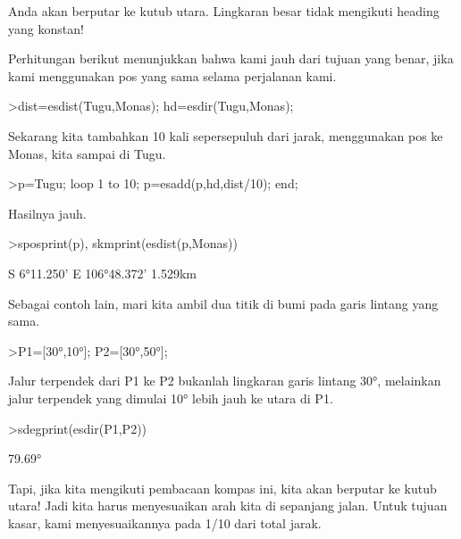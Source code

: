 \documentclass[a4paper,10pt]{article}
\begin{document}
\begin{eulernotebook}
\begin{eulercomment}
\begin{eulercomment}
\begin{eulercomment}
\begin{eulercomment}
\begin{eulercomment}
\begin{eulercomment}
\begin{eulercomment}
\begin{eulercomment}
\begin{eulercomment}
\begin{eulercomment}
\begin{eulercomment}
\begin{eulercomment}
\begin{eulercomment}
\begin{eulercomment}
\begin{eulercomment}
\begin{eulercomment}
\begin{eulercomment}
Anda akan berputar ke kutub utara. Lingkaran besar tidak mengikuti
heading yang konstan!

Perhitungan berikut menunjukkan bahwa kami jauh dari tujuan yang
benar, jika kami menggunakan pos yang sama selama perjalanan kami.
\end{eulercomment}
\begin{eulerprompt}
>dist=esdist(Tugu,Monas); hd=esdir(Tugu,Monas);
\end{eulerprompt}
\begin{eulercomment}
Sekarang kita tambahkan 10 kali sepersepuluh dari jarak, menggunakan
pos ke Monas, kita sampai di Tugu.
\end{eulercomment}
\begin{eulerprompt}
>p=Tugu; loop 1 to 10; p=esadd(p,hd,dist/10); end;
\end{eulerprompt}
\begin{eulercomment}
Hasilnya jauh.
\end{eulercomment}
\begin{eulerprompt}
>sposprint(p), skmprint(esdist(p,Monas))
\end{eulerprompt}
\begin{euleroutput}
  S 6°11.250' E 106°48.372'
       1.529km
\end{euleroutput}
\begin{eulercomment}
Sebagai contoh lain, mari kita ambil dua titik di bumi pada garis
lintang yang sama.
\end{eulercomment}
\begin{eulerprompt}
>P1=[30°,10°]; P2=[30°,50°];
\end{eulerprompt}
\begin{eulercomment}
Jalur terpendek dari P1 ke P2 bukanlah lingkaran garis lintang 30°,
melainkan jalur terpendek yang dimulai 10° lebih jauh ke utara di P1.
\end{eulercomment}
\begin{eulerprompt}
>sdegprint(esdir(P1,P2))
\end{eulerprompt}
\begin{euleroutput}
       79.69°
\end{euleroutput}
\begin{eulercomment}
Tapi, jika kita mengikuti pembacaan kompas ini, kita akan berputar ke
kutub utara! Jadi kita harus menyesuaikan arah kita di sepanjang
jalan. Untuk tujuan kasar, kami menyesuaikannya pada 1/10 dari total
jarak.
\end{eulercomment}
\begin{eulerprompt}

\end{eulerprompt}
\end{eulercomment}
\end{eulercomment}
\end{eulercomment}
\end{eulercomment}
\end{eulercomment}
\end{eulercomment}
\end{eulercomment}
\end{eulercomment}
\end{eulercomment}
\end{eulercomment}
\end{eulercomment}
\end{eulercomment}
\end{eulercomment}
\end{eulercomment}
\end{eulercomment}
\end{eulercomment}
\end{eulernotebook}
\end{document}
